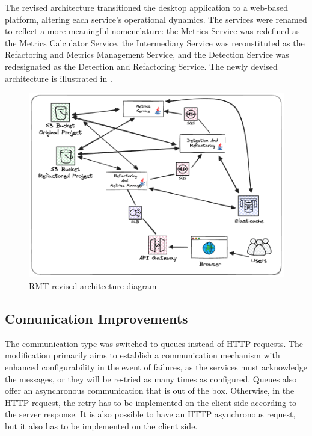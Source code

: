The revised architecture transitioned the desktop application to a web-based platform, altering each service's operational dynamics. The services were renamed to reflect a more meaningful nomenclature: the Metrics Service was redefined as the Metrics Calculator Service, the Intermediary Service was reconstituted as the Refactoring and Metrics Management Service, and the Detection Service was redesignated as the Detection and Refactoring Service. The newly devised architecture is illustrated in .

\begin{figure}[ht!]
\SetCaptionWidth{\textwidth}
\caption{RMT revised architecture diagram}
\label{fig-async}
\includegraphics[width =\textwidth, scale=0.2]{Chapter-5/Figures/Async.png}
\end{figure}
\FloatBarrier

\subsection{Comunication Improvements}

The communication type was switched to queues instead of HTTP requests. The modification primarily aims to establish a communication mechanism with enhanced configurability in the event of failures, as the services must acknowledge the messages, or they will be re-tried as many times as configured. Queues also offer an asynchronous communication that is out of the box. Otherwise, in the HTTP request, the retry has to be implemented on the client side according to the server response. It is also possible to have an HTTP asynchronous request, but it also has to be implemented on the client side.

